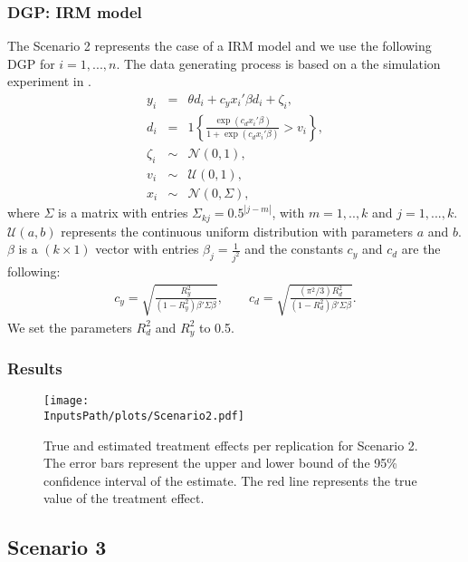 \documentclass[10pt]{article}
\newcommand*{\InputsFolderPath}{C:/DEV/DML/src/data/}
\newcommand*{\InputsPath}{\InputsFolderPath/20221108}
\begin{document}
\subsubsection{DGP: IRM model}
The Scenario 2 represents the case of a IRM model and we use the following DGP for $i=1,...,n$.
The data generating process is based on a the simulation experiment in \cite{Bell2017}.
\begin{eqnarray*}\label{dgp_3.1}
	y_i &=& \theta d_i + c_y x_i' \beta d_i + \zeta_i, \\
	d_i &=& 1\left\lbrace \frac{\exp(c_d x_i' \beta)}{1+\exp(c_d x_i' \beta)} > v_i \right\rbrace, \\
	\zeta_i &\sim& \mathcal{N}(0,1), \\	
	v_i
	&\sim& \mathcal{U}(0,1),\\
	x_i &\sim& \mathcal{N}(0, \Sigma),
\end{eqnarray*}
where $\Sigma$ is a matrix with entries $\Sigma_{kj} = 0.5^{|j-m|}$, with $m=1,..,k$ and $j=1,...,k$.
$\mathcal{U}(a,b)$ represents the continuous uniform distribution with parameters $a$ and $b$.
$\beta$ is a $(k\times 1)$ vector with entries $\beta_j=\frac{1}{j^2}$ and the constants $c_y$ and $c_d$ are the following:
\begin{eqnarray*}\label{dgp_3.2}
	c_y = \sqrt{\frac{R_y^2}{(1-R_y^2) \beta' \Sigma \beta}}, \qquad 
	c_d =\sqrt{\frac{(\pi^2 /3) R_d^2}{(1-R_d^2) \beta' \Sigma \beta}}.
\end{eqnarray*}
We set the parameters $R^2_d$ and $R^2_y$ to 0.5.
\subsubsection{Results}
\begin{figure}[H]
	\begin{center}
		\texttt{[image: \\InputsPath/plots/Scenario2.pdf]}
		\caption{True and estimated treatment effects per replication for Scenario 2. The error bars represent the upper and lower bound of the 95\% confidence interval of the estimate. The red line represents the true value of the treatment effect.}
		\label{Scenario2}
	\end{center}
\end{figure}



\subsection{Scenario 3}
\end{document}

